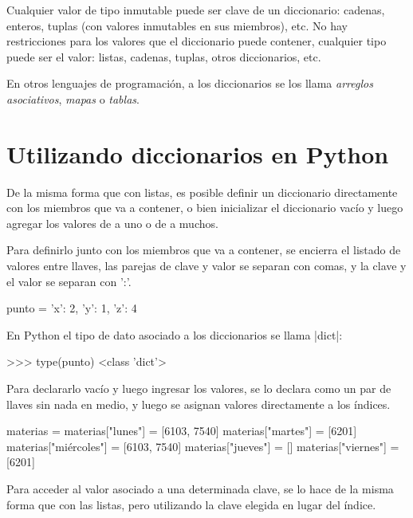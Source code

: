 Cualquier valor de tipo inmutable puede ser clave de un diccionario:
cadenas, enteros, tuplas (con valores inmutables en sus miembros), etc.  No hay
restricciones para los valores que el diccionario puede contener, cualquier
tipo puede ser el valor: listas, cadenas, tuplas, otros diccionarios,
etc.

\begin{sabias_que}
En otros lenguajes de programación, a los diccionarios se los llama \emph{arreglos asociativos},
\emph{mapas} o \emph{tablas}.
\end{sabias_que}

\section{Utilizando diccionarios en Python}

De la misma forma que con listas, es posible definir un diccionario
directamente con los miembros que va a contener, o bien inicializar el
diccionario vacío y luego agregar los valores de a uno o de a muchos.

Para definirlo junto con los miembros que va a contener, se encierra el
listado de valores entre llaves, las parejas de clave y valor se separan
con comas, y la clave y el valor se separan con ':'.

\begin{codigo-python-sn}
punto = {'x': 2, 'y': 1, 'z': 4}
\end{codigo-python-sn}

\begin{observacion}
En Python el tipo de dato asociado a los diccionarios se llama |dict|:

\begin{codigo-python-sn}
>>> type(punto)
<class 'dict'>
\end{codigo-python-sn}
\end{observacion}

Para declararlo vacío y luego ingresar los valores, se lo declara como un
par de llaves sin nada en medio, y luego se asignan valores directamente a
los índices.

\begin{codigo-python-sn}
materias = {}
materias["lunes"] = [6103, 7540]
materias["martes"] = [6201]
materias["miércoles"] = [6103, 7540]
materias["jueves"] = []
materias["viernes"] = [6201]
\end{codigo-python-sn}

Para acceder al valor asociado a una determinada clave, se lo hace
de la misma forma que con las listas, pero utilizando la clave
elegida en lugar del índice.

